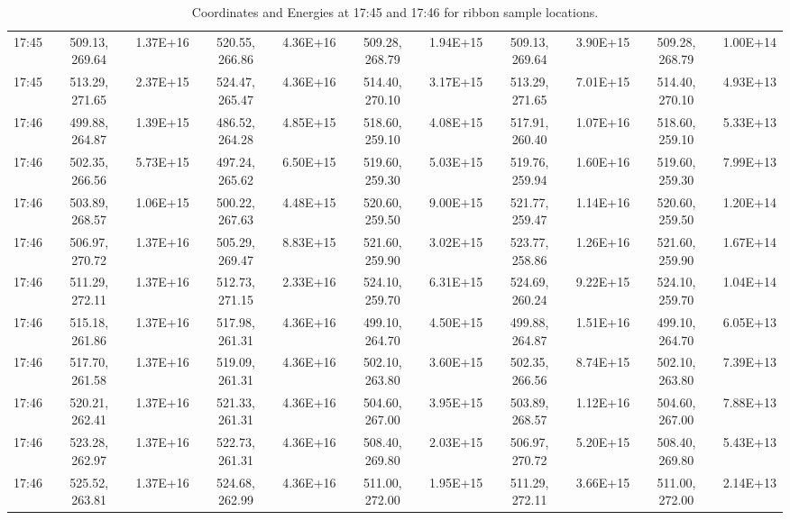 \begin{sidewaystable}[h]
\begin{tabular}{|c|c|c|c|c|c|c|c|c|c|c|}
17:45 & 509.13, 269.64 & 1.37E+16 & 520.55, 266.86 & 4.36E+16 & 509.28, 268.79 & 1.94E+15 & 509.13, 269.64 & 3.90E+15 & 509.28, 268.79 & 1.00E+14\\
17:45 & 513.29, 271.65 & 2.37E+15 & 524.47, 265.47 & 4.36E+16 & 514.40, 270.10 & 3.17E+15 & 513.29, 271.65 & 7.01E+15 & 514.40, 270.10 & 4.93E+13\\
17:46 & 499.88, 264.87 & 1.39E+15 & 486.52, 264.28 & 4.85E+15 & 518.60, 259.10 & 4.08E+15 & 517.91, 260.40 & 1.07E+16 & 518.60, 259.10 & 5.33E+13\\
17:46 & 502.35, 266.56 & 5.73E+15 & 497.24, 265.62 & 6.50E+15 & 519.60, 259.30 & 5.03E+15 & 519.76, 259.94 & 1.60E+16 & 519.60, 259.30 & 7.99E+13\\
17:46 & 503.89, 268.57 & 1.06E+15 & 500.22, 267.63 & 4.48E+15 & 520.60, 259.50 & 9.00E+15 & 521.77, 259.47 & 1.14E+16 & 520.60, 259.50 & 1.20E+14\\
17:46 & 506.97, 270.72 & 1.37E+16 & 505.29, 269.47 & 8.83E+15 & 521.60, 259.90 & 3.02E+15 & 523.77, 258.86 & 1.26E+16 & 521.60, 259.90 & 1.67E+14\\
17:46 & 511.29, 272.11 & 1.37E+16 & 512.73, 271.15 & 2.33E+16 & 524.10, 259.70 & 6.31E+15 & 524.69, 260.24 & 9.22E+15 & 524.10, 259.70 & 1.04E+14\\
17:46 & 515.18, 261.86 & 1.37E+16 & 517.98, 261.31 & 4.36E+16 & 499.10, 264.70 & 4.50E+15 & 499.88, 264.87 & 1.51E+16 & 499.10, 264.70 & 6.05E+13\\
17:46 & 517.70, 261.58 & 1.37E+16 & 519.09, 261.31 & 4.36E+16 & 502.10, 263.80 & 3.60E+15 & 502.35, 266.56 & 8.74E+15 & 502.10, 263.80 & 7.39E+13\\
17:46 & 520.21, 262.41 & 1.37E+16 & 521.33, 261.31 & 4.36E+16 & 504.60, 267.00 & 3.95E+15 & 503.89, 268.57 & 1.12E+16 & 504.60, 267.00 & 7.88E+13\\
17:46 & 523.28, 262.97 & 1.37E+16 & 522.73, 261.31 & 4.36E+16 & 508.40, 269.80 & 2.03E+15 & 506.97, 270.72 & 5.20E+15 & 508.40, 269.80 & 5.43E+13\\
17:46 & 525.52, 263.81 & 1.37E+16 & 524.68, 262.99 & 4.36E+16 & 511.00, 272.00 & 1.95E+15 & 511.29, 272.11 & 3.66E+15 & 511.00, 272.00 & 2.14E+13\\
\end{tabular}
\caption{Coordinates and Energies at 17:45 and 17:46 for ribbon sample locations.}\label{ribenergytab}
\end{sidewaystable}
